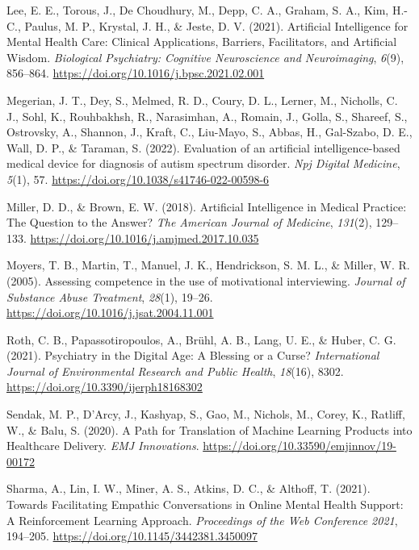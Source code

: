 \documentclass[
  man]{apa7}
\newlength{\cslhangindent}
\newlength{\cslentryspacingunit} %
\newenvironment{CSLReferences}[2] %
 {%
  \setlength{\parindent}{0pt}
  \ifodd #1
  \let\oldpar\par
  \def\par{\hangindent=\cslhangindent\oldpar}
  \fi
  \setlength{\parskip}{#2\cslentryspacingunit}
 }%
 {}
\begin{document}
\begin{CSLReferences}{1}{0}
\leavevmode{}%
Lee, E. E., Torous, J., De Choudhury, M., Depp, C. A., Graham, S. A., Kim, H.-C., Paulus, M. P., Krystal, J. H., \& Jeste, D. V. (2021). Artificial {Intelligence} for {Mental} {Health} {Care}: {Clinical} {Applications}, {Barriers}, {Facilitators}, and {Artificial} {Wisdom}. \emph{Biological Psychiatry: Cognitive Neuroscience and Neuroimaging}, \emph{6}(9), 856--864. \url{https://doi.org/10.1016/j.bpsc.2021.02.001}

\leavevmode{}%
Megerian, J. T., Dey, S., Melmed, R. D., Coury, D. L., Lerner, M., Nicholls, C. J., Sohl, K., Rouhbakhsh, R., Narasimhan, A., Romain, J., Golla, S., Shareef, S., Ostrovsky, A., Shannon, J., Kraft, C., Liu-Mayo, S., Abbas, H., Gal-Szabo, D. E., Wall, D. P., \& Taraman, S. (2022). Evaluation of an artificial intelligence-based medical device for diagnosis of autism spectrum disorder. \emph{Npj Digital Medicine}, \emph{5}(1), 57. \url{https://doi.org/10.1038/s41746-022-00598-6}

\leavevmode{}%
Miller, D. D., \& Brown, E. W. (2018). Artificial {Intelligence} in {Medical} {Practice}: {The} {Question} to the {Answer}? \emph{The American Journal of Medicine}, \emph{131}(2), 129--133. \url{https://doi.org/10.1016/j.amjmed.2017.10.035}

\leavevmode{}%
Moyers, T. B., Martin, T., Manuel, J. K., Hendrickson, S. M. L., \& Miller, W. R. (2005). Assessing competence in the use of motivational interviewing. \emph{Journal of Substance Abuse Treatment}, \emph{28}(1), 19--26. \url{https://doi.org/10.1016/j.jsat.2004.11.001}

\leavevmode{}%
Roth, C. B., Papassotiropoulos, A., Brühl, A. B., Lang, U. E., \& Huber, C. G. (2021). Psychiatry in the {Digital} {Age}: {A} {Blessing} or a {Curse}? \emph{International Journal of Environmental Research and Public Health}, \emph{18}(16), 8302. \url{https://doi.org/10.3390/ijerph18168302}

\leavevmode{}%
Sendak, M. P., D'Arcy, J., Kashyap, S., Gao, M., Nichols, M., Corey, K., Ratliff, W., \& Balu, S. (2020). A {Path} for {Translation} of {Machine} {Learning} {Products} into {Healthcare} {Delivery}. \emph{EMJ Innovations}. \url{https://doi.org/10.33590/emjinnov/19-00172}

\leavevmode{}%
Sharma, A., Lin, I. W., Miner, A. S., Atkins, D. C., \& Althoff, T. (2021). Towards {Facilitating} {Empathic} {Conversations} in {Online} {Mental} {Health} {Support}: {A} {Reinforcement} {Learning} {Approach}. \emph{Proceedings of the {Web} {Conference} 2021}, 194--205. \url{https://doi.org/10.1145/3442381.3450097}


\end{CSLReferences}
\end{document}
